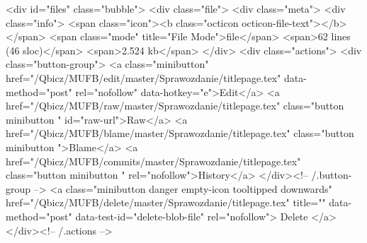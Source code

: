 <div id="files" class="bubble">
  <div class="file">
    <div class="meta">
      <div class="info">
        <span class="icon"><b class="octicon octicon-file-text"></b></span>
        <span class="mode" title="File Mode">file</span>
          <span>62 lines (46 sloc)</span>
        <span>2.524 kb</span>
      </div>
      <div class="actions">
        <div class="button-group">
                <a class="minibutton"
                   href="/Qbicz/MUFB/edit/master/Sprawozdanie/titlepage.tex"
                   data-method="post" rel="nofollow" data-hotkey="e">Edit</a>
          <a href="/Qbicz/MUFB/raw/master/Sprawozdanie/titlepage.tex" class="button minibutton " id="raw-url">Raw</a>
            <a href="/Qbicz/MUFB/blame/master/Sprawozdanie/titlepage.tex" class="button minibutton ">Blame</a>
          <a href="/Qbicz/MUFB/commits/master/Sprawozdanie/titlepage.tex" class="button minibutton " rel="nofollow">History</a>
        </div><!-- /.button-group -->
          <a class="minibutton danger empty-icon tooltipped downwards"
             href="/Qbicz/MUFB/delete/master/Sprawozdanie/titlepage.tex"
             title=""
             data-method="post" data-test-id="delete-blob-file" rel="nofollow">
          Delete
        </a>
      </div><!-- /.actions -->

